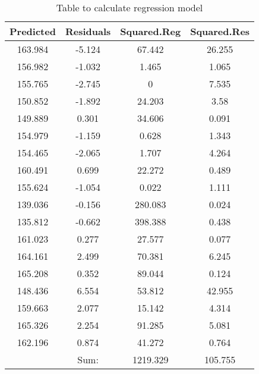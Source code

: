 \documentclass[11pt]{exam}
\begin{document}
\ifprintanswers
\begin{table}[ht]
\begin{center}
\begin{tabular}{|c|c|c|c|}
  \hline
Predicted & Residuals & Squared.Reg & Squared.Res \\ 
  \hline
163.984 & -5.124 & 67.442 & 26.255 \\ 
   \hline
156.982 & -1.032 & 1.465 & 1.065 \\ 
   \hline
155.765 & -2.745 & 0 & 7.535 \\ 
   \hline
150.852 & -1.892 & 24.203 & 3.58 \\ 
   \hline
149.889 & 0.301 & 34.606 & 0.091 \\ 
   \hline
154.979 & -1.159 & 0.628 & 1.343 \\ 
   \hline
154.465 & -2.065 & 1.707 & 4.264 \\ 
   \hline
160.491 & 0.699 & 22.272 & 0.489 \\ 
   \hline
155.624 & -1.054 & 0.022 & 1.111 \\ 
   \hline
139.036 & -0.156 & 280.083 & 0.024 \\ 
   \hline
135.812 & -0.662 & 398.388 & 0.438 \\ 
   \hline
161.023 & 0.277 & 27.577 & 0.077 \\ 
   \hline
164.161 & 2.499 & 70.381 & 6.245 \\ 
   \hline
165.208 & 0.352 & 89.044 & 0.124 \\ 
   \hline
148.436 & 6.554 & 53.812 & 42.955 \\ 
   \hline
159.663 & 2.077 & 15.142 & 4.314 \\ 
   \hline
165.326 & 2.254 & 91.285 & 5.081 \\ 
   \hline
162.196 & 0.874 & 41.272 & 0.764 \\ 
   \hline
\hline
 & Sum: & 1219.329 & 105.755 \\ 
   \hline
\end{tabular}
\caption{Table to calculate regression model}
\label{tab:401k-reg}
\end{center}
\end{table}\else
% 
\end{document}
